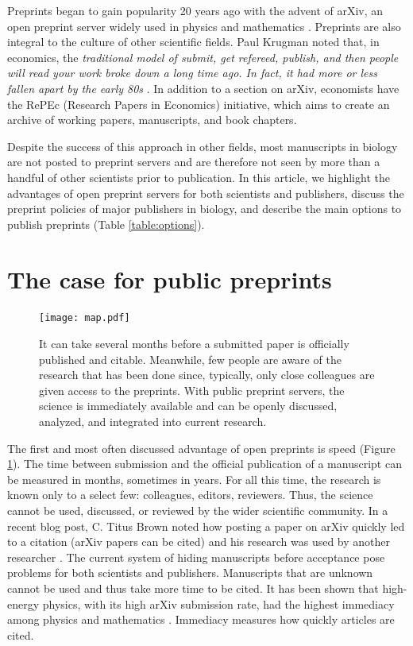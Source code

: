 \documentclass[letterpaper]{article}
\begin{document}
Preprints began to gain popularity 20 years ago with the advent of arXiv, an
open preprint server widely used in physics and mathematics \cite{gin11}.
Preprints are also integral to the culture of other scientific fields.  Paul
Krugman noted that, in economics, the \emph{traditional model of submit, get
refereed, publish, and then people will read your work broke down a long time
ago. In fact, it had more or less fallen apart by the early 80s} \cite{kru12}.
In addition to a section on arXiv, economists have the RePEc (Research Papers in
Economics) initiative, which aims to create an archive of working papers,
manuscripts, and book chapters.

Despite the success of this approach in other fields, most manuscripts in
biology are not posted to preprint servers and are therefore not seen by more
than a handful of other scientists prior to publication. In this article, we
highlight the advantages of open preprint servers for both scientists and
publishers, discuss the preprint policies of major publishers in biology, and
describe the main options to publish preprints (Table \ref{table:options}).

\section{The case for public preprints}

\begin{figure}[ht!] \centering\texttt{[image: map.pdf]} \caption {It can take several months before a submitted paper is
officially published and citable. Meanwhile, few people are aware of the
research that has been done since, typically, only close colleagues are
given access to the preprints. With public preprint servers, the science is
immediately available and can be openly discussed, analyzed, and integrated
into current research.} \label{fig:map} \end{figure}

The first and most often discussed advantage of open preprints is
speed (Figure \ref{fig:map}). The time between submission and the official
publication of a manuscript can be measured in months, sometimes in years. For
all this time, the research is known only to a select few: colleagues, editors,
reviewers. Thus, the science cannot be used, discussed, or reviewed by the wider
scientific community. In a recent blog post, C. Titus Brown noted how posting a
paper on arXiv quickly led to a citation (arXiv papers can be cited) and his
research was used by another researcher \cite{bro12}. The current system of
hiding manuscripts before acceptance pose problems for both scientists and
publishers. Manuscripts that are unknown cannot be used and thus take more time
to be cited. It has been shown that high-energy physics, with its high arXiv
submission rate, had the highest immediacy among physics and mathematics
\cite{pra05}. Immediacy measures how quickly articles are cited. 
\end{document}
